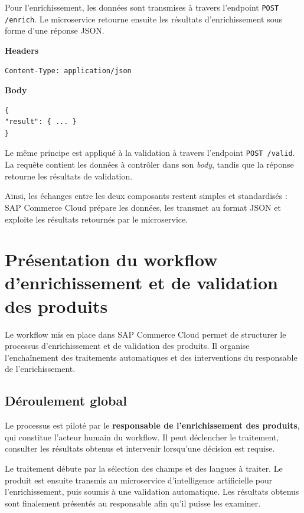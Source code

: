 Pour l'enrichissement, les données sont transmises à travers l'endpoint \texttt{POST /enrich}. Le microservice retourne ensuite les résultats d'enrichissement sous forme d'une réponse JSON.

\begin{tcolorbox}[
colback=white,
colframe=black,
coltext=black,
title=Réponse HTTP -- /enrich,
fonttitle=\bfseries,
boxrule=0.6pt,
arc=1mm
]
\textbf{Headers}
\begin{verbatim}
Content-Type: application/json
\end{verbatim}

\textbf{Body}
\begin{verbatim}
{
"result": { ... }
}
\end{verbatim}
\end{tcolorbox}

Le même principe est appliqué à la validation à travers l'endpoint \texttt{POST /valid}. La requête contient les données à contrôler dans son \textit{body}, tandis que la réponse retourne les résultats de validation.

Ainsi, les échanges entre les deux composants restent simples et standardisés : SAP Commerce Cloud prépare les données, les transmet au format JSON et exploite les résultats retournés par le microservice.

\section{Présentation du workflow d'enrichissement et de validation des produits}

Le workflow mis en place dans SAP Commerce Cloud permet de structurer le processus d'enrichissement et de validation des produits. Il organise l'enchaînement des traitements automatiques et des interventions du responsable de l'enrichissement.

\subsection{Déroulement global}

Le processus est piloté par le \textbf{responsable de l'enrichissement des produits}, qui constitue l'acteur humain du workflow. Il peut déclencher le traitement, consulter les résultats obtenus et intervenir lorsqu'une décision est requise.

Le traitement débute par la sélection des champs et des langues à traiter. Le produit est ensuite transmis au microservice d'intelligence artificielle pour l'enrichissement, puis soumis à une validation automatique. Les résultats obtenus sont finalement présentés au responsable afin qu'il puisse les examiner.

